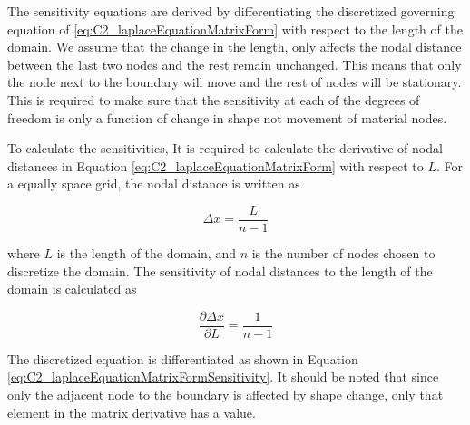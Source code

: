 The sensitivity equations are derived by differentiating the discretized governing equation of \eqref{eq:C2_laplaceEquationMatrixForm} with respect to the length of the domain. We assume that the change in the length, only affects the nodal distance between the last two nodes and the rest remain unchanged. This means that only the node next to the boundary will move and the rest of nodes will be stationary. This is required to make sure that the sensitivity at each of the degrees of freedom is only a function of change in shape not movement of material nodes.

To calculate the sensitivities, It is required to calculate the derivative of nodal distances in Equation \eqref{eq:C2_laplaceEquationMatrixForm} with respect to $L$. For a equally space grid, the nodal distance is written as

\begin{equation*}
	\Delta x = \frac{L}{n - 1}
\end{equation*}

where $L$ is the length of the domain, and $n$ is the number of nodes chosen to discretize the domain. The sensitivity of nodal distances to the length of the domain is calculated as

\begin{equation}\label{eq:C2_nodeDistanceSensitivity}
	\frac{\partial \Delta x}{\partial L} = \frac{1}{n-1}
\end{equation}

The discretized equation is differentiated as shown in Equation \eqref{eq:C2_laplaceEquationMatrixFormSensitivity}. It should be noted that since only the adjacent node to the boundary is affected by shape change, only that element in the matrix derivative has a value.

